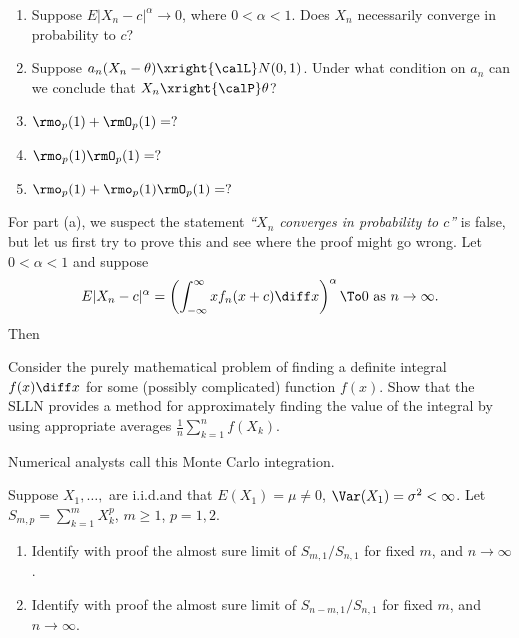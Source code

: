 \begin{problem}[DasGupta 7.2 (a), (b), (c), (d), (e)]
  \begin{enumerate}[label=(\alph*),noitemsep]
  \item Suppose \(E|X_n-c|^\alpha\to 0\), where \(0<\alpha<1\). Does
    \(X_n\) necessarily converge in probability to \(c\)?
  \item Suppose \(a_n(X_n-\theta)\xright{\calL}N(0,1)\). Under what
    condition on \(a_n\) can we conclude that \(X_n\xright{\calP}\theta\)?
  \item \(\rmo_p(1)+\rmO_p(1)=?\)
  \item \(\rmo_p(1)\rmO_p(1)=?\)
  \item \(\rmo_p(1)+\rmo_p(1)\rmO_p(1)=?\)
  \end{enumerate}
\end{problem}
\begin{solution}
  For part (a), we suspect the statement \textsl{``\(X_n\) converges in
    probability to \(c\)''} is false, but let us first try to prove this
  and see where the proof might go wrong. Let \(0<\alpha<1\) and suppose
  \[
    E|X_n-c|^\alpha=%
    \left(\int_{-\infty}^\infty xf_n(x+c)\diff x\right)^\alpha%
    \To 0%
    \text{ as \(n\to\infty\).}
  \]
  Then
\end{solution}
\newpage

\begin{problem}
  Consider the purely mathematical problem of finding a definite integral
  \(f(x)\diff x\) for some (possibly complicated) function \(f(x)\). Show
  that the SLLN provides a method for approximately finding the value of
  the integral by using appropriate averages
  \(\frac{1}{n}\sum_{k=1}^n f(X_k)\).

  Numerical analysts call this Monte Carlo integration.
\end{problem}
\begin{solution}

\end{solution}
\newpage

\begin{problem}[DasGupta 7.4 (a), (b)]
  Suppose \(X_1,\dotsc,\) are i.i.d.\@ and that \(E(X_1)=\mu\neq 0\),
  \(\Var(X_1)=\sigma^2<\infty\). Let \(S_{m,p}=\sum_{k=1}^m X_k^p\),
  \(m\geq 1\), \(p=1,2\).
  \begin{enumerate}[label=(\alph*),noitemsep]
  \item Identify with proof the almost sure limit of \(S_{m,1}/S_{n,1}\)
    for fixed \(m\), and \(n\to\infty\).
  \item Identify with proof the almost sure limit of \(S_{n-m,1}/S_{n,1}\)
    for fixed \(m\), and \(n\to\infty\).
  \end{enumerate}
\end{problem}
\begin{solution}

\end{solution}
\newpage

